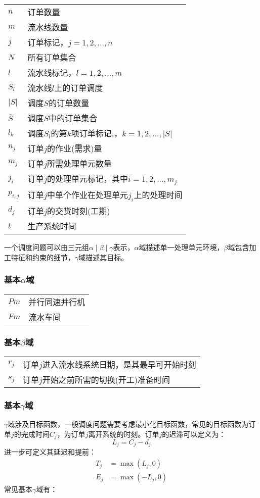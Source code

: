 \begin{supertabular}{ll}
$n$ & 订单数量\\
$m$ & 流水线数量\\
$j$ & 订单标记，$j = 1,2,...,n$\\
$N$ & 所有订单集合\\
$l$ & 流水线标记，$l = 1,2,...,m$\\
$S_l$ & 流水线$l$上的订单调度\\
$|S|$ & 调度$S$的订单数量\\
$\overline S$ & 调度$S$中的订单集合\\
$l_k$ & 调度$S_l$的第$k$项订单标记,，$k = 1,2,...,|S|$\\
$n_j$ & 订单$j$的作业(需求)量\\
$m_j$ & 订单$j$所需处理单元数量\\
$j_i$ & 订单$j$的处理单元标记，其中$i = 1,2,...,m_j$\\
$p_{i,j}$ & 订单$j$中单个作业在处理单元$j_i$上的处理时间\\
$d_j$ & 订单$j$的交货时刻(工期)\\
$t$ & 生产系统时间\\[3pt]
\end{supertabular}

一个调度问题可以由三元组$\alpha \mid \beta \mid \gamma$表示，$\alpha$域描述单一处理单元环境，$\beta$域包含加工特征和约束的细节，$\gamma$域描述其目标\cite{pinedo}。

\subsubsection{基本$\alpha$域}
\begin{supertabular}{ll}
$Pm$ & 并行同速并行机\\
$Fm$ & 流水车间\\
\end{supertabular}

\subsubsection{基本$\beta$域}
\begin{supertabular}{ll}
$r_j$ & 订单$j$进入流水线系统日期，是其最早可开始时刻\\
$s_j$ & 订单$j$开始之前所需的切换(开工)准备时间\\
\end{supertabular}

\subsubsection{基本$\gamma$域}
$\gamma$域涉及目标函数，一般调度问题需要考虑最小化目标函数，常见的目标函数为订单$j$的完成时间$C_j$，为订单$j$离开系统的时刻。订单$j$的迟滞可以定义为：
\[
L_j = C_j - d_j
\]
进一步可定义其延迟和提前：
\begin{align*}
T_j & = \max(L_j,0)\\
E_j & = \max(-L_j,0)
\end{align*}
常见基本$\gamma$域有：

